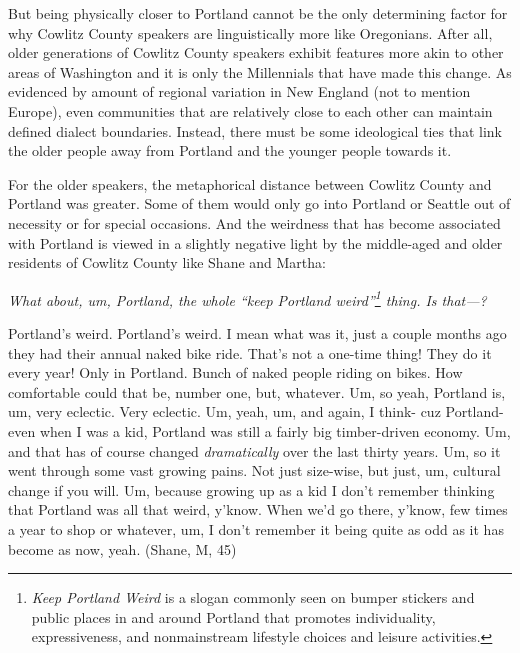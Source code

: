But being physically closer to Portland cannot be the only determining factor for why Cowlitz County speakers are linguistically more like Oregonians. After all, older generations of Cowlitz County speakers exhibit features more akin to other areas of Washington and it is only the Millennials that have made this change. As evidenced by amount of regional variation in New England (not to mention Europe), even communities that are relatively close to each other can maintain defined dialect boundaries. Instead, there must be some ideological ties that link the older people away from Portland and the younger people towards it.

For the older speakers, the metaphorical distance between Cowlitz County and Portland was greater. Some of them would only go into Portland or Seattle out of necessity or for special occasions. And the weirdness that has become associated with Portland is viewed in a slightly negative light by the middle-aged and older residents of Cowlitz County like Shane and Martha:
\begin{num_quote}
    \textit{What about, um, Portland, the whole ``keep Portland weird''\hspace{1.5pt}\footnote{\textit{Keep Portland Weird} is a slogan commonly seen on bumper stickers and public places in and around Portland that promotes individuality, expressiveness, and nonmainstream lifestyle choices and leisure activities.} thing. Is that---?}

    Portland's weird. Portland's weird. I mean what was it, just a couple months ago they had their annual naked bike ride. That's not a one-time thing! They do it every year! Only in Portland. Bunch of naked people riding on bikes. How comfortable could that be, number one, but, whatever. Um, so yeah, Portland is, um, very eclectic. Very eclectic. Um, yeah, um, and again, I think- cuz Portland- even when I was a kid, Portland was still a fairly big timber-driven economy. Um, and that has of course changed \textit{dramatically} over the last thirty years. Um, so it went through some vast growing pains. Not just size-wise, but just, um, cultural change if you will. Um, because growing up as a kid I don't remember thinking that Portland was all that weird, y'know. When we'd go there, y'know, few times a year to shop or whatever, um, I don't remember it being quite as odd as it has become as now, yeah. (Shane, M, 45)\label{quote:portlands_weird}
\end{num_quote}
